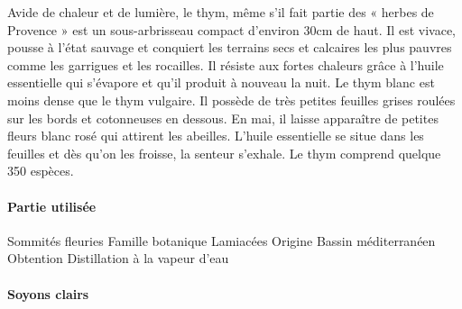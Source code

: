 \documentclass[12pt,a4wide]{article}
\begin{document}
Avide de chaleur et de lumière, le thym, même s'il fait partie des « herbes de Provence » est un sous-arbrisseau compact d'environ 30cm de haut. Il est vivace, pousse à l'état sauvage et conquiert les terrains secs et calcaires les plus pauvres comme les garrigues et les rocailles. Il résiste aux fortes chaleurs grâce à l'huile essentielle qui s'évapore et qu'il produit à nouveau la nuit. Le thym blanc est moins dense que le thym vulgaire. Il possède de très petites feuilles grises roulées sur les bords et cotonneuses en dessous. En mai, il laisse apparaître de petites fleurs blanc rosé qui attirent les abeilles.
L'huile essentielle se situe dans les feuilles et dès qu'on les froisse, la senteur s'exhale.
Le thym comprend quelque 350 espèces.

\paragraph{Partie utilisée}
\label{sec-4-10-2-2}
Sommités fleuries
Famille botanique
Lamiacées
Origine
Bassin méditerranéen
Obtention
Distillation à la vapeur d'eau

\paragraph{Soyons clairs}
\label{sec-4-10-2-3}
\end{document}
